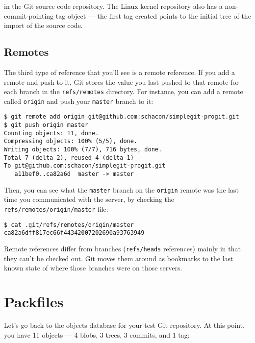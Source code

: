 \documentclass[a4paper]{book}
\newcounter{tab}[chapter]
\begin{document}
in the Git source code repository. The Linux kernel repository also has a non-commit-pointing tag object --- the first tag created points to the initial tree of the import of the source code.

\subsection{Remotes}\label{remotes}

The third type of reference that you'll see is a remote reference. If you add a remote and push to it, Git stores the value you last pushed to that remote for each branch in the \texttt{refs/remotes} directory. For instance, you can add a remote called \texttt{origin} and push your \texttt{master} branch to it:

\begin{shaded}\begin{verbatim}
$ git remote add origin git@github.com:schacon/simplegit-progit.git
$ git push origin master
Counting objects: 11, done.
Compressing objects: 100% (5/5), done.
Writing objects: 100% (7/7), 716 bytes, done.
Total 7 (delta 2), reused 4 (delta 1)
To git@github.com:schacon/simplegit-progit.git
   a11bef0..ca82a6d  master -> master
\end{verbatim}\end{shaded}

Then, you can see what the \texttt{master} branch on the \texttt{origin} remote was the last time you communicated with the server, by checking the \texttt{refs/remotes/origin/master} file:

\begin{shaded}\begin{verbatim}
$ cat .git/refs/remotes/origin/master
ca82a6dff817ec66f44342007202690a93763949
\end{verbatim}\end{shaded}

Remote references differ from branches (\texttt{refs/heads} references) mainly in that they can't be checked out. Git moves them around as bookmarks to the last known state of where those branches were on those servers.

\section{Packfiles}\label{packfiles}

Let's go back to the objects database for your test Git repository. At this point, you have 11 objects --- 4 blobs, 3 trees, 3 commits, and 1 tag:
\end{document}
